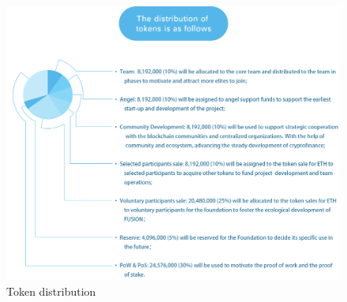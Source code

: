 \documentclass[a4paper,12pt]{article}
\begin{document}


\begin{figure} [htbp]
\centering \includegraphics [width = 6in]{pic/tokenratio.png}
\caption{Token distribution} \label{fig: tokenratio}
\end{figure}

\appendix
\clearpage
\renewcommand \refname{REFERENCES}


\clearpage

\end{document}
